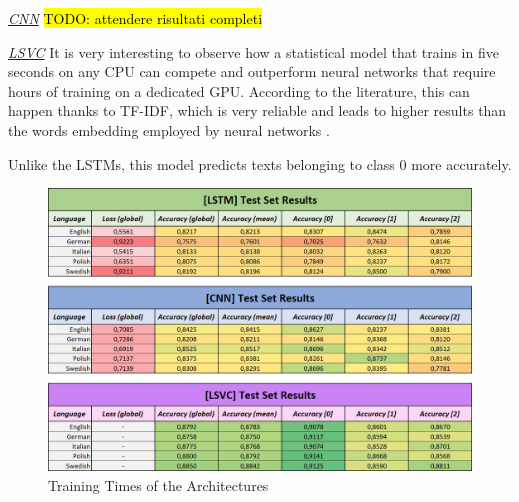 \documentclass[letterpaper,11pt]{article}
\begin{document}
\underline{\textit{CNN}} \hl{TODO: attendere risultati completi}

\underline{\textit{LSVC}} It is very interesting to observe how a statistical model that trains in five seconds on any CPU can compete and outperform neural networks that require hours of training on a dedicated GPU. According to the literature, this can happen thanks to TF-IDF, which is very reliable and leads to higher results than the words embedding employed by neural networks \cite{cahyani2021performance}.

Unlike the LSTMs, this model predicts texts belonging to class 0 more accurately.

\begin{figure}[H]
  \centering
  \includegraphics[width=\textwidth]{results.png}
  \caption{Training Times of the Architectures}
  \label{fig:results}
\end{figure}
\end{document}
